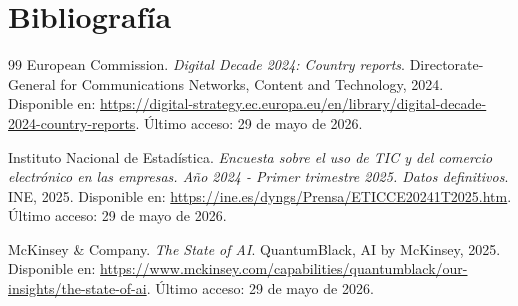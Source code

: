 \documentclass[12pt,a4paper,openany]{book}
\begin{document}


















%




\cleardoublepage
\chapter{\textbf{Bibliografía}}
\label{ch:Bibliografia}
\thispagestyle{fancy}

\begin{thebibliography}{99}
European Commission. \textit{Digital Decade 2024: Country reports}. Directorate-General for Communications Networks, Content and Technology, 2024. Disponible en: \url{https://digital-strategy.ec.europa.eu/en/library/digital-decade-2024-country-reports}. Último acceso: 29 de mayo de 2026.

Instituto Nacional de Estadística. \textit{Encuesta sobre el uso de TIC y del comercio electrónico en las empresas. Año 2024 - Primer trimestre 2025. Datos definitivos}. INE, 2025. Disponible en: \url{https://ine.es/dyngs/Prensa/ETICCE20241T2025.htm}. Último acceso: 29 de mayo de 2026.

McKinsey \& Company. \textit{The State of AI}. QuantumBlack, AI by McKinsey, 2025. Disponible en: \url{https://www.mckinsey.com/capabilities/quantumblack/our-insights/the-state-of-ai}. Último acceso: 29 de mayo de 2026.
\end{thebibliography}


\cleardoublepage


%












%
%
%




\end{document}
